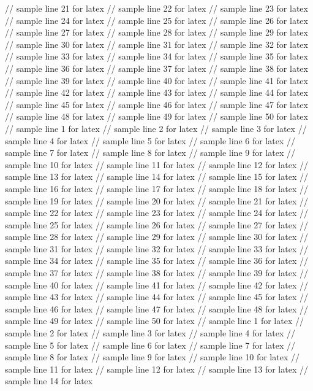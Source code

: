 // sample line 21 for latex
// sample line 22 for latex
// sample line 23 for latex
// sample line 24 for latex
// sample line 25 for latex
// sample line 26 for latex
// sample line 27 for latex
// sample line 28 for latex
// sample line 29 for latex
// sample line 30 for latex
// sample line 31 for latex
// sample line 32 for latex
// sample line 33 for latex
// sample line 34 for latex
// sample line 35 for latex
// sample line 36 for latex
// sample line 37 for latex
// sample line 38 for latex
// sample line 39 for latex
// sample line 40 for latex
// sample line 41 for latex
// sample line 42 for latex
// sample line 43 for latex
// sample line 44 for latex
// sample line 45 for latex
// sample line 46 for latex
// sample line 47 for latex
// sample line 48 for latex
// sample line 49 for latex
// sample line 50 for latex
// sample line 1 for latex
// sample line 2 for latex
// sample line 3 for latex
// sample line 4 for latex
// sample line 5 for latex
// sample line 6 for latex
// sample line 7 for latex
// sample line 8 for latex
// sample line 9 for latex
// sample line 10 for latex
// sample line 11 for latex
// sample line 12 for latex
// sample line 13 for latex
// sample line 14 for latex
// sample line 15 for latex
// sample line 16 for latex
// sample line 17 for latex
// sample line 18 for latex
// sample line 19 for latex
// sample line 20 for latex
// sample line 21 for latex
// sample line 22 for latex
// sample line 23 for latex
// sample line 24 for latex
// sample line 25 for latex
// sample line 26 for latex
// sample line 27 for latex
// sample line 28 for latex
// sample line 29 for latex
// sample line 30 for latex
// sample line 31 for latex
// sample line 32 for latex
// sample line 33 for latex
// sample line 34 for latex
// sample line 35 for latex
// sample line 36 for latex
// sample line 37 for latex
// sample line 38 for latex
// sample line 39 for latex
// sample line 40 for latex
// sample line 41 for latex
// sample line 42 for latex
// sample line 43 for latex
// sample line 44 for latex
// sample line 45 for latex
// sample line 46 for latex
// sample line 47 for latex
// sample line 48 for latex
// sample line 49 for latex
// sample line 50 for latex
// sample line 1 for latex
// sample line 2 for latex
// sample line 3 for latex
// sample line 4 for latex
// sample line 5 for latex
// sample line 6 for latex
// sample line 7 for latex
// sample line 8 for latex
// sample line 9 for latex
// sample line 10 for latex
// sample line 11 for latex
// sample line 12 for latex
// sample line 13 for latex
// sample line 14 for latex
